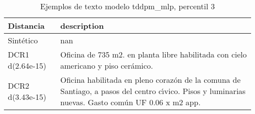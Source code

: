 \begin{table}[H]
\centering
\fontsize{10}{14}\selectfont
\caption{Ejemplos de texto modelo tddpm\_mlp, percentil 3}
\label{table-example-economicos-b-2-tddpm_mlp-3p-text}
\begin{tabular}{|l|m{35em}|}
\hline
\rowcolor[gray]{0.8}
Distancia & description \\
\hline Sintético & nan \\
\hline DCR1 d(2.64e-15) & Oficina de 735 m2.  en planta libre habilitada con cielo americano y piso cer\'amico. \\
\hline DCR2 d(3.43e-15) & Oficina habilitada en pleno coraz\'on de la comuna de Santiago, a pasos del centro c{\'\i}vico.  Pisos y luminarias nuevas.  Gasto com\'un UF 0.06 x m2 app. \\
\hline
\end{tabular}
\end{table}
